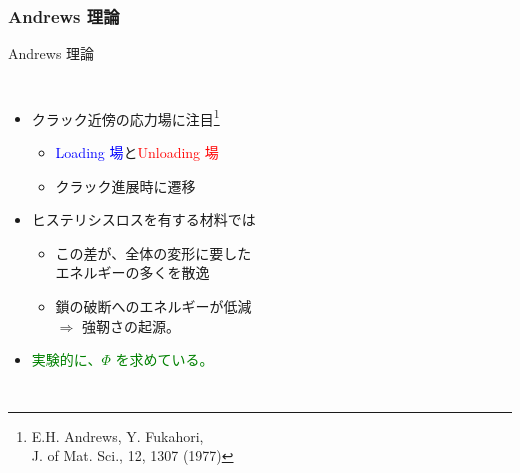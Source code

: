 \documentclass[aspectratio=169,11pt, dvipdfmx]{beamer}
\begin{document}
\begin{frame}
	\frametitle{Andrews 理論}
	\vspace{-2mm}
	\begin{exampleblock}{Andrews 理論}
		\begin{columns}[totalwidth=1\textwidth]
			\begin{itemize}
			\item クラック近傍の応力場に注目\footnote{
					\scriptsize{E.H. Andrews, Y. Fukahori, \\J. of Mat. Sci., 12, 1307 (1977)}
					}
					\begin{itemize}
						\item \textcolor{blue}{Loading 場}と\textcolor{red}{Unloading 場}
						\item クラック進展時に遷移
					\end{itemize}
			\item ヒステリシスロスを有する材料では
				\begin{itemize}
				\item
				\alert{この差}が、全体の変形に要した\\エネルギーの多くを\alert{散逸}
				\item
			鎖の破断へのエネルギーが低減 \\$\Rightarrow$ \alert{強靭さの起源。}
				\end{itemize}	
			\item \textcolor{green}{実験的に、$\Phi$ を求めている。}
			\end{itemize}
		

\end{columns}
\end{exampleblock}
\end{frame}
\end{document}
